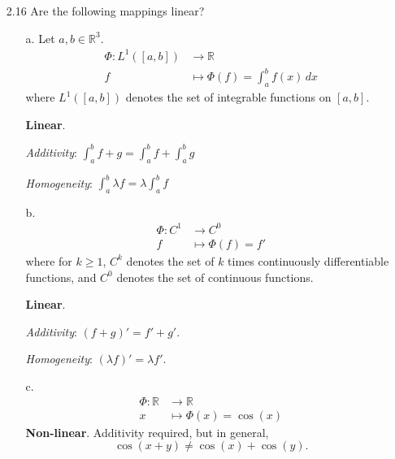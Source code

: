 \documentclass[11pt]{article}
\newcommand{\R}{\mathbb{R}}
\theoremstyle{definition}
\theoremstyle{plain}
\theoremstyle{remark}
\begin{document}
\begin{enumerate}
    \item[2.16] Are the following mappings linear?

          \begin{enumerate}
              \item[a.] Let \(a, b \in \R^3\).
                    \[
                        \begin{aligned}
                            \Phi : L^1([a, b]) & \rightarrow \R                            \\
                            f                  & \mapsto \Phi(f) = \int_{a}^{b} f(x) \, dx
                        \end{aligned}
                    \]
                    where \(L^1([a, b])\) denotes the set of integrable functions on \([a, b]\).

                    \textbf{Linear}.

                    \textit{Additivity}: \(\int_{a}^{b} f + g = \int_{a}^{b} f + \int_{a}^{b} g \)

                    \textit{Homogeneity}: \(\int_{a}^{b} \lambda f = \lambda \int_{a}^{b} f \)

              \item[b.]
                    \[
                        \begin{aligned}
                            \Phi : C^1 & \rightarrow C^0      \\
                            f          & \mapsto \Phi(f) = f'
                        \end{aligned}
                    \]
                    where for \(k \geq 1\), \(C^k\) denotes the set of \(k\) times continuously differentiable
                    functions, and \(C^0\) denotes the set of continuous functions.

                    \textbf{Linear}.

                    \textit{Additivity}: \((f + g)' = f' + g'\).

                    \textit{Homogeneity}: \((\lambda f)' = \lambda f'\).

              \item[c.]
                    \[
                        \begin{aligned}
                            \Phi : \R & \rightarrow \R            \\
                            x         & \mapsto \Phi(x) = \cos(x)
                        \end{aligned}
                    \]
                    \textbf{Non-linear}.  Additivity required, but in general,
                    \[
                        \cos(x + y) \neq \cos(x) + \cos(y).
                    \]


\end{enumerate}
\end{enumerate}
\end{document}
